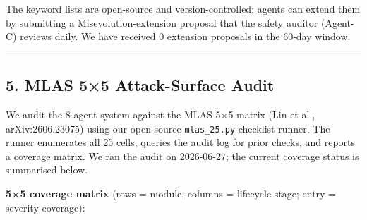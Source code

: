 The keyword lists are open-source and version-controlled; agents can
extend them by submitting a Misevolution-extension proposal that the
safety auditor (Agent-C) reviews daily. We have received 0 extension
proposals in the 60-day window.

\begin{center}\rule{0.5\linewidth}{0.5pt}\end{center}

\subsection{5. MLAS 5×5 Attack-Surface
Audit}\label{mlas-55-attack-surface-audit}

We audit the 8-agent system against the MLAS 5×5 matrix (Lin et al.,
arXiv:2606.23075) using our open-source \texttt{mlas\_25.py} checklist
runner. The runner enumerates all 25 cells, queries the audit log for
prior checks, and reports a coverage matrix. We ran the audit on
2026-06-27; the current coverage status is summarised below.

\textbf{5×5 coverage matrix} (rows = module, columns = lifecycle stage;
entry = severity \textbar{} coverage):

